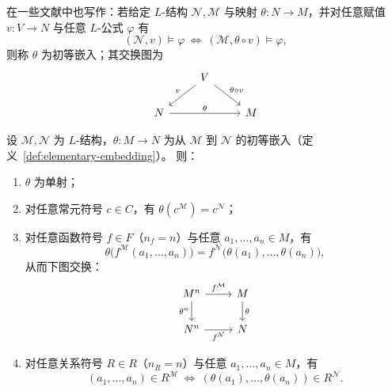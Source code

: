 \documentclass[lang=cn,a4paper,newtx,section]{elegantbook}
\begin{document}
在一些文献中也写作：若给定 $L$-结构 $\mathcal N,\mathcal M$ 与映射 $\theta:N\to M$，并对任意赋值 $v:V\to N$ 与任意 $L$-公式 $\varphi$ 有
\[
  (\mathcal N,v)\models\varphi \ \Longleftrightarrow\ (\mathcal M,\theta\circ v)\models\varphi,
\]
则称 $\theta$ 为初等嵌入；其交换图为
\[
\begin{tikzcd}
& V \arrow[dl, "v"'] \arrow[dr, "\theta\circ v"] & \\
N \arrow[rr, "\theta"] & & M
\end{tikzcd}
\]

\begin{proposition}[初等嵌入的基本性质]
\label{elementary-embedding-basic-properties}
设 $\mathcal M,\mathcal N$ 为 $L$-结构，$\theta:M\to N$ 为从 $\mathcal M$ 到 $\mathcal N$ 的初等嵌入（定义~\ref{def:elementary-embedding}）。
则：
\begin{enumerate}
  \item $\theta$ 为单射；
  \item 对任意常元符号 $c\in C$，有 $\theta(c^{\mathcal M})=c^{\mathcal N}$；
  \item 对任意函数符号 $f\in F$（$n_f=n$）与任意 $a_1,\dots,a_n\in M$，有
  \[
    \theta\bigl(f^{\mathcal M}(a_1,\dots,a_n)\bigr)=f^{\mathcal N}\bigl(\theta(a_1),\dots,\theta(a_n)\bigr),
  \]
  从而下图交换：
  \[
  \begin{tikzcd}
  M^{n} \arrow[r, "f^{\mathcal M}"] \arrow[d, "\theta^{n}"'] & M \arrow[d, "\theta"] \\
  N^{n} \arrow[r, "f^{\mathcal N}"'] & N
  \end{tikzcd}
  \]
  \item 对任意关系符号 $R\in R$（$n_R=n$）与任意 $a_1,\dots,a_n\in M$，有
  \[
    (a_1,\dots,a_n)\in R^{\mathcal M}\ \Longleftrightarrow\ (\theta(a_1),\dots,\theta(a_n))\in R^{\mathcal N}.
  \]
\end{enumerate}
\end{proposition}
\end{document}
